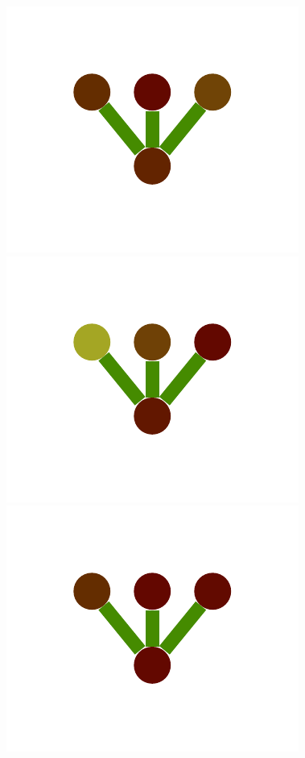 \documentclass[a4paper,10pt]{article}
\begin{document}
\begin{figure}
{    \includegraphics[scale=.2]{../figures/vector/6-1-single-color-flower-induced-3.pdf}
    \includegraphics[scale=.2]{../figures/vector/6-1-single-color-flower-induced-4.pdf}
    \includegraphics[scale=.2]{../figures/vector/6-1-single-color-flower-induced-5.pdf}
}
\end{figure}
\end{document}
